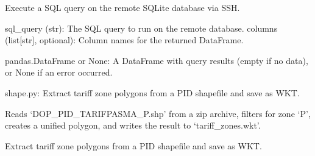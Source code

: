 \documentclass[letterpaper,10pt,english]{sphinxmanual}
\begin{document}
\begin{fulllineitems}
\begin{fulllineitems}
\label{\detokenize{api:managers.request_manager.RequestManager.server_request}}
\pysigstartsignatures
{}
\pysigstopsignatures
\sphinxAtStartPar
Execute a SQL query on the remote SQLite database via SSH.
\begin{description}
\sphinxAtStartPar
sql\_query (str): The SQL query to run on the remote database.
columns (list{[}str{]}, optional): Column names for the returned DataFrame.

\sphinxAtStartPar
pandas.DataFrame or None: A DataFrame with query results (empty if no data),
or None if an error occurred.

\end{description}

\end{fulllineitems}


\end{fulllineitems}

\label{\detokenize{api:module-shape}}
\sphinxAtStartPar
shape.py: Extract tariff zone polygons from a PID shapefile and save as WKT.

\sphinxAtStartPar
Reads ‘DOP\_PID\_TARIFPASMA\_P.shp’ from a zip archive, filters for zone ‘P’,
creates a unified polygon, and writes the result to ‘tariff\_zones.wkt’.

\begin{fulllineitems}
\label{\detokenize{api:shape.main}}
\pysigstartsignatures
{}
\pysigstopsignatures
\sphinxAtStartPar
Extract tariff zone polygons from a PID shapefile and save as WKT.

\end{fulllineitems}
\end{document}
